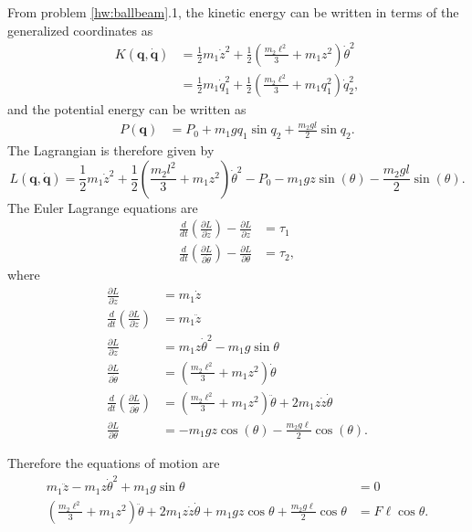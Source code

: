 From problem \ref{hw:ballbeam}.1, the kinetic energy can be written in terms of the generalized coordinates as
\begin{align*}
K(\mathbf{q},\dot{\mathbf{q}}) &=   \frac{1}{2} m_1 \dot{z}^2 + \frac{1}{2} \left( \frac{m_2 \ell^2 }{3} + m_1 z^2 \right) \dot{\theta}^2
 \\
&= \frac{1}{2} m_1 \dot{q}_1^2 + \frac{1}{2} \left( \frac{m_2 \ell^2 }{3} + m_1 q_1^2 \right) \dot{q}_2^2,
\end{align*}
and the potential energy can be written as
\begin{align*}
P(\mathbf{q}) &= P_0 + m_1 g q_1 \sin q_2 + \frac{m_2 g l}{2} \sin q_2.
\end{align*}
The Lagrangian is therefore given by
\[
L(\mathbf{q},\dot{\mathbf{q}}) = \frac{1}{2} m_1 \dot{z}^2 + \frac{1}{2} \left( \frac{m_2 l^2 }{3} + m_1 z^2 \right) \dot{\theta}^2 - P_0 - m_1 g z \sin(\theta) - \frac{m_2 g l}{2} \sin(\theta).
\]
The Euler Lagrange equations are
\begin{align*}
\frac{d}{dt} \left( \frac{\partial L}{\partial \dot{z}} \right) - \frac{\partial L}{\partial z} &= \tau_1 \\
\frac{d}{dt} \left( \frac{\partial L}{\partial \dot{\theta}} \right) - \frac{\partial L}{\partial \theta} &= \tau_2,
\end{align*}
where
\begin{align*}
\frac{\partial L}{\partial \dot{z}} &= m_1 \dot{z} \\
\frac{d}{dt} \left( \frac{\partial L}{\partial \dot{z}} \right) &= m_1 \ddot{z} \\
\frac{\partial L}{\partial z} &= m_1 z \dot{\theta}^2 - m_1 g \sin{\theta} \\
\frac{\partial L}{\partial \dot{\theta}} &= \left( \frac{m_2 \ell^2 }{3} + m_1 z^2 \right) \dot{\theta} \\
\frac{d}{dt} \left( \frac{\partial L}{\partial \dot{\theta}} \right) &= \left( \frac{m_2 \ell^2}{3} + m_1 z^2 \right) \ddot{\theta} + 2 m_1 z \dot{z} \dot{\theta} \\
\frac{\partial L}{\partial \theta} &= - m_1 g z \cos(\theta) - \frac{m_2 g \ell}{2} \cos(\theta).
\end{align*}

Therefore the equations of motion are
\begin{align*}
 m_1\ddot{z} - m_1 z \dot{\theta}^2 + m_1 g \sin\theta &= 0 \\
\left( \frac{m_2 \ell^2}{3} + m_1 z^2 \right) \ddot{\theta} + 2 m_1 z \dot{z} \dot{\theta} + m_1 g z \cos{\theta} + \frac{m_2 g \ell}{2} \cos{\theta} &= F \ell \cos{\theta}.
\end{align*}

